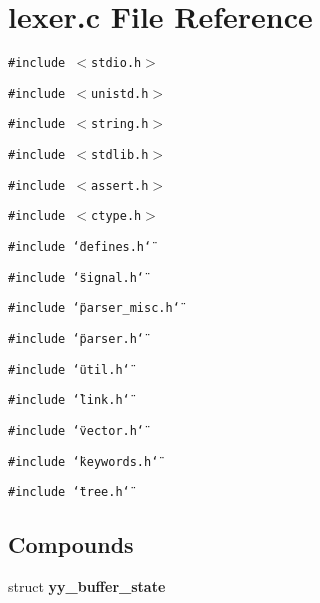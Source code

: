 \section{lexer.c File Reference}
\label{lexer_8c}
{\tt \#include $<$stdio.h$>$}\par
{\tt \#include $<$unistd.h$>$}\par
{\tt \#include $<$string.h$>$}\par
{\tt \#include $<$stdlib.h$>$}\par
{\tt \#include $<$assert.h$>$}\par
{\tt \#include $<$ctype.h$>$}\par
{\tt \#include \char`\"{}defines.h\char`\"{}}\par
{\tt \#include \char`\"{}signal.h\char`\"{}}\par
{\tt \#include \char`\"{}parser\_\-misc.h\char`\"{}}\par
{\tt \#include \char`\"{}parser.h\char`\"{}}\par
{\tt \#include \char`\"{}util.h\char`\"{}}\par
{\tt \#include \char`\"{}link.h\char`\"{}}\par
{\tt \#include \char`\"{}vector.h\char`\"{}}\par
{\tt \#include \char`\"{}keywords.h\char`\"{}}\par
{\tt \#include \char`\"{}tree.h\char`\"{}}\par
\subsection*{Compounds}
\begin{CompactItemize}
\item 
struct {\bf yy\_\-buffer\_\-state}
\end{CompactItemize}
